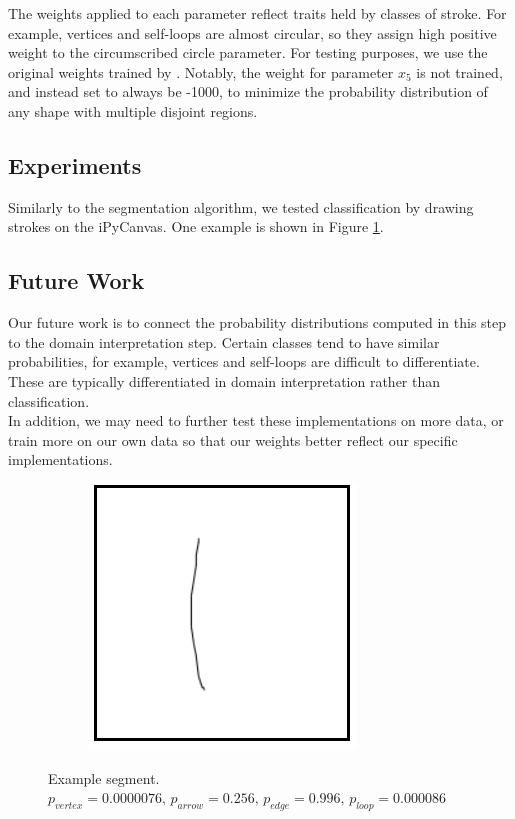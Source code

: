 The weights applied to each parameter reflect traits held by classes of stroke. For example, vertices and self-loops are almost circular, so they assign high positive weight to the circumscribed circle parameter. For testing purposes, we use the original weights trained by \citeauthor{daly2015hand} \cite{daly2015hand}. Notably, the weight for parameter $x_5$ is not trained, and instead set to always be -1000, to minimize the probability distribution of any shape with multiple disjoint regions.

\subsection{Experiments}
Similarly to the segmentation algorithm, we tested classification by drawing strokes on the iPyCanvas. One example is shown in Figure \ref{fig:classification_example}.

\subsection{Future Work}

Our future work is to connect the probability distributions computed in this step to the domain interpretation step. Certain classes tend to have similar probabilities, for example, vertices and self-loops are difficult to differentiate. These are typically differentiated in domain interpretation rather than classification. \\

In addition, we may need to further test these implementations on more data, or train more on our own data so that our weights better reflect our specific implementations.

\begin{figure}
	\centering
	\begin{subfigure}{0.9\textwidth}
		\centering
		\includegraphics[scale=0.5]{./img/classificationexample}
	\end{subfigure}
	\caption{Example segment. $p_{vertex} = 0.0000076\text{, }   p_{arrow} = 0.256\text{, } p_{edge} = 0.996\text{, }  p_{loop} = 0.000086$}
	\label{fig:classification_example}
\end{figure}
